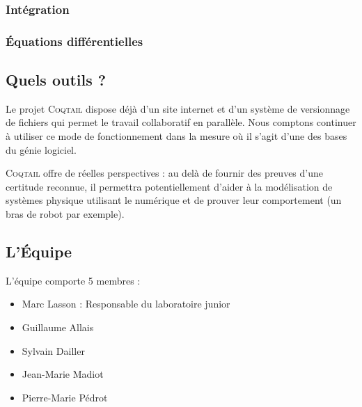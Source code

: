\documentclass[11pt]{article}
\newcommand{\coqtail}{\textsc{Coqtail}}
\newcommand{\coquille}{\textsc{Coquille}}
\begin{document}
\subsubsection{Intégration}



\subsubsection{Équations différentielles}


\subsection{Quels outils ?}

Le projet \coqtail{} dispose déjà d'un site internet\cite{coqtail} et d'un système de versionnage de fichiers qui permet le travail collaboratif en parallèle. Nous comptons continuer à utiliser ce mode de fonctionnement dans la mesure où il s'agit d'une des bases du génie logiciel.




\coqtail{} offre de réelles perspectives : au delà de fournir des preuves d'une certitude reconnue, %
il permettra potentiellement d'aider à la modélisation de systèmes physique utilisant le numérique et de prouver leur comportement (un bras de robot par exemple). %

\subsection{L'Équipe}

L'équipe comporte 5 membres :

\begin{itemize}
 \item Marc Lasson : Responsable du laboratoire junior
 \item Guillaume Allais
 \item Sylvain Dailler
 \item Jean-Marie Madiot
 \item Pierre-Marie Pédrot
\end{itemize}
\end{document}
